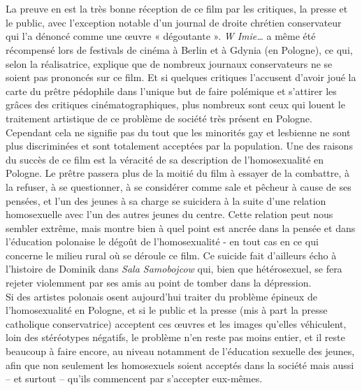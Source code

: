 \documentclass[12pt, twocolumn]{amsart}
\begin{document}
\\ \\
La preuve en est la très bonne réception de ce film par les critiques, la presse et le public, avec l’exception notable d’un journal de droite chrétien conservateur qui l’a dénoncé comme une œuvre « dégoutante ». \emph{W Imie…} a même été récompensé lors de festivals de cinéma à Berlin et à Gdynia (en Pologne), ce qui, selon la réalisatrice, explique que de nombreux journaux conservateurs ne se soient pas prononcés sur ce film. Et si quelques critiques l’accusent d’avoir joué la carte du prêtre pédophile dans l’unique but de faire polémique et s’attirer les grâces des critiques cinématographiques, plus nombreux sont ceux qui louent le traitement artistique de ce problème de société très présent en Pologne. Cependant cela ne signifie pas du tout que les minorités gay et lesbienne ne sont plus discriminées et sont totalement acceptées par la population. Une des raisons du succès de ce film est la véracité de sa description de l’homosexualité en Pologne. Le prêtre passera plus de la moitié du film à essayer de la combattre, à la refuser, à se questionner, à se considérer comme sale et pêcheur à cause de ses pensées, et l’un des jeunes à sa charge se suicidera à la suite d’une relation homosexuelle avec l’un des autres jeunes du centre. Cette relation peut nous sembler extrême, mais montre bien à quel point est ancrée dans la pensée et dans l’éducation polonaise le dégoût de l’homosexualité - en tout cas en ce qui concerne le milieu rural où se déroule ce film. Ce suicide fait d’ailleurs écho à l’histoire de Dominik dans \emph{Sala Samobojcow} qui, bien que hétérosexuel, se fera rejeter violemment par ses amis au point de tomber dans la dépression. \\
Si des artistes polonais osent aujourd’hui traiter du problème épineux de l’homosexualité en Pologne, et si le public et la presse (mis à part la presse catholique conservatrice) acceptent ces œuvres et les images qu’elles véhiculent, loin des stéréotypes négatifs, le problème n’en reste pas moins entier, et il reste beaucoup à faire encore, au niveau notamment de l’éducation sexuelle des jeunes, afin que non seulement les homosexuels soient acceptés dans la société mais aussi – et surtout – qu’ils commencent par s’accepter eux-mêmes.
\clearpage
\end{document}
